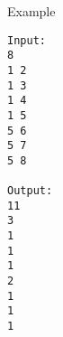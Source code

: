 Example
\begin{verbatim}
Input:
8
1 2
1 3
1 4
1 5
5 6
5 7
5 8

Output:
11
3
1
1
1
2
1
1
1

\end{verbatim}